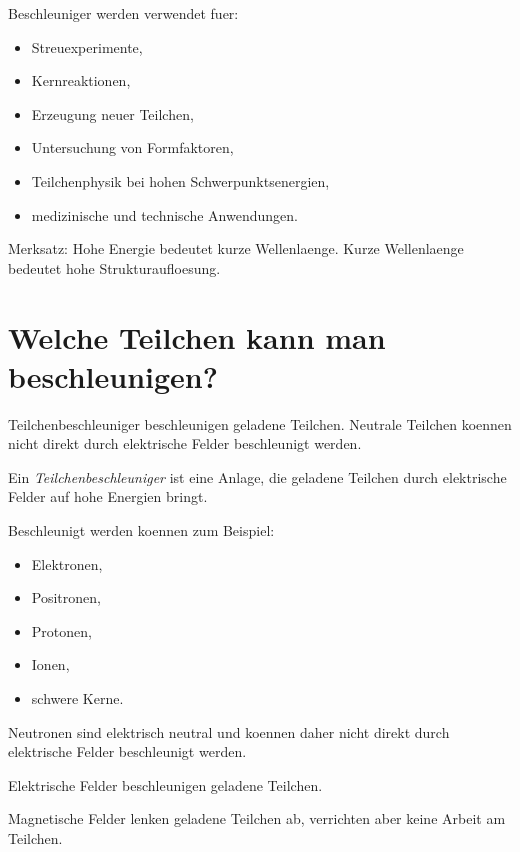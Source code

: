 \begin{conceptbox}
Beschleuniger werden verwendet fuer:
\begin{itemize}
    \item Streuexperimente,
    \item Kernreaktionen,
    \item Erzeugung neuer Teilchen,
    \item Untersuchung von Formfaktoren,
    \item Teilchenphysik bei hohen Schwerpunktsenergien,
    \item medizinische und technische Anwendungen.
\end{itemize}
\end{conceptbox}

\begin{examtipbox}
Merksatz:
Hohe Energie bedeutet kurze Wellenlaenge.
Kurze Wellenlaenge bedeutet hohe Strukturaufloesung.
\end{examtipbox}

\section{Welche Teilchen kann man beschleunigen?}

Teilchenbeschleuniger beschleunigen geladene Teilchen.
Neutrale Teilchen koennen nicht direkt durch elektrische Felder beschleunigt werden.

\begin{definitionbox}
Ein \emph{Teilchenbeschleuniger} ist eine Anlage, die geladene Teilchen durch
elektrische Felder auf hohe Energien bringt.
\end{definitionbox}

\begin{conceptbox}
Beschleunigt werden koennen zum Beispiel:
\begin{itemize}
    \item Elektronen,
    \item Positronen,
    \item Protonen,
    \item Ionen,
    \item schwere Kerne.
\end{itemize}

Neutronen sind elektrisch neutral und koennen daher nicht direkt durch elektrische
Felder beschleunigt werden.
\end{conceptbox}

\begin{examtipbox}
Elektrische Felder beschleunigen geladene Teilchen.

Magnetische Felder lenken geladene Teilchen ab, verrichten aber keine Arbeit am
Teilchen.
\end{examtipbox}

